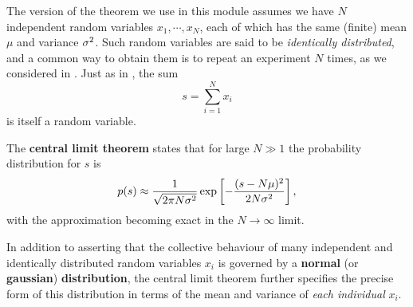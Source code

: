 The version of the theorem we use in this module assumes we have $N$ independent random variables $x_1, \cdots, x_N$, each of which has the same (finite) mean $\mu$ and variance $\sigma^2$.
Such random variables are said to be \textit{identically distributed}, and a common way to obtain them is to repeat an experiment $N$ times, as we considered in .
Just as in , the sum
\begin{equation}
  \label{eq:CLTsum}
  s = \sum_{i = 1}^N x_i
\end{equation}
is itself a random variable.

\begin{shaded}
  The \textbf{central limit theorem} states that for large $N \gg 1$ the probability distribution for $s$ is
  \begin{equation}
    \label{eq:CLT}
    p(s) \approx \frac{1}{\sqrt{2\pi N\sigma^2}} \exp\left[-\frac{(s - N\mu)^2}{2N\sigma^2}\right],
  \end{equation}
  with the approximation becoming exact in the $N \to \infty$ limit.
\end{shaded}
In addition to asserting that the collective behaviour of many independent and identically distributed random variables $x_i$ is governed by a \textbf{normal} (or \textbf{gaussian}) \textbf{distribution}, the central limit theorem further specifies the precise form of this distribution in terms of the mean and variance of \textit{each individual} $x_i$. %

